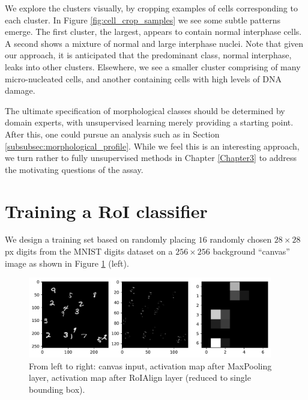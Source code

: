 We explore the clusters visually, by cropping examples of cells corresponding to each cluster. In Figure \ref{fig:cell_crop_samples} we see some subtle patterns emerge. The first cluster, the largest, appears to contain normal interphase cells. A second shows a mixture of normal and large interphase nuclei. Note that given our approach, it is anticipated that the predominant class, normal interphase, leaks into other clusters.   Elsewhere, we see a smaller cluster comprising of many micro-nucleated cells, and another containing cells with high levels of DNA damage.

The ultimate specification of morphological classes should be determined by domain experts, with unsupervised learning merely providing a starting point. After this, one could pursue an analysis such as in Section \ref{subsubsec:morphological_profile}. While we feel this is an interesting approach, we turn rather to fully unsupervised methods in Chapter \ref{Chapter3} to address the motivating questions of the assay.

\section{Training a RoI classifier}
\label{sec:training_roi_classifier}
We design a training set based on randomly placing $16$ randomly chosen $28 \times 28$px digits from the MNIST digits dataset on a $256 \times 256$ background ``canvas'' image as shown in Figure \ref{fig:roi_layers} (left).

\begin{figure}[h]
\centering
\includegraphics[width=0.95\textwidth]{img/roi_layers_full.pdf}
\caption{From left to right: canvas input, activation map after MaxPooling layer, activation map after RoIAlign layer (reduced to single bounding box).}
\label{fig:roi_layers}
\end{figure}

